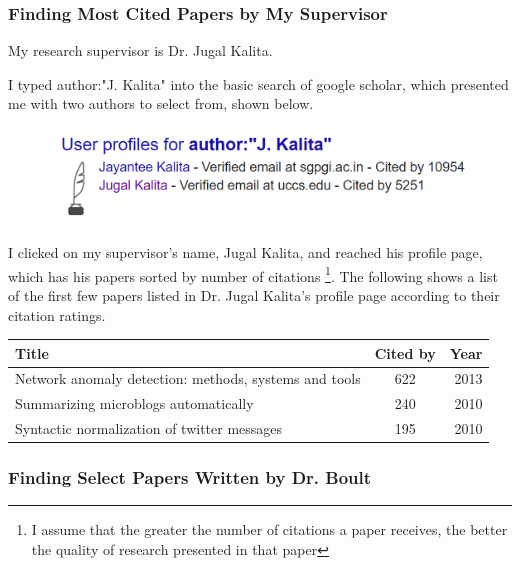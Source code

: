 \documentclass[journal]{IEEEtran}
\begin{document}
\subsubsection{Finding Most Cited Papers by My Supervisor}  

My research supervisor is Dr. Jugal Kalita.  

I typed author:"J. Kalita" into the basic search of google scholar, which presented me with two authors to select from, shown below.  

\begin{figure}[H]
	\begin{center}
		\includegraphics[width=0.9\linewidth]{images/fig2}
	\end{center}
	\captionsetup{labelformat=empty}
\end{figure}  

I clicked on my supervisor's name, Jugal Kalita, and reached his profile page, which has his papers sorted by number of citations \footnote{I assume that the greater the number of citations a paper receives, the better the quality of research presented in that paper}.  
The following shows a list of the first few papers listed in Dr. Jugal Kalita's profile page according to their citation ratings.      

\begin{center}
	\begin{tabular}{ |l|c|r| } 
		\hline
		{\footnotesize \textbf{Title}} & {\footnotesize \textbf{Cited by}} & {\footnotesize \textbf{Year}}\\
		\hline
		{\tiny Network anomaly detection: methods, systems and tools \cite{article157}} & {\tiny 622} & {\tiny 2013} \\ 
		\hline
		{\tiny Summarizing microblogs automatically \cite{article158}} & {\tiny 240} & {\tiny 2010} \\ 
		\hline
		{\tiny Syntactic normalization of twitter messages \cite{article159}} & {\tiny 195} & {\tiny 2010} \\ 
		\hline		
	\end{tabular}
\end{center}  

\subsubsection{Finding Select Papers Written by Dr. Boult}  
\end{document}
